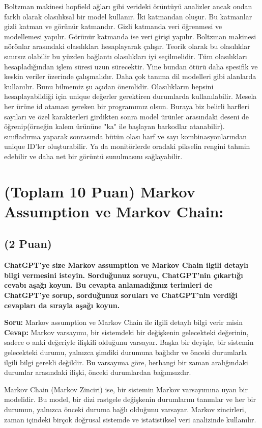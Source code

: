 \documentclass[11pt]{article}
\begin{document}
Boltzman makinesi hopfield ağları gibi verideki örüntüyü analizler ancak ondan farklı olarak olasılıksal bir model kullanır. İki katmandan oluşur. Bu katmanlar gizli katman ve görünür katmandır. Gizli katmanda veri öğrenmesi ve modellemesi yapılır. Görünür katmanda ise veri girişi yapılır. Boltzman makinesi nörönlar arasındaki olasılıkları hesaplayarak çalışır. Teorik olarak bu olasılıklar sınırsız olabilir bu yüzden bağlantı olasılıkları iyi seçilmelidir. Tüm olasılıkları hesapladığından işlem süresi uzun sürecektir. Yine bundan ötürü daha spesifik ve keskin veriler üzerinde çalışmalıdır. Daha çok tanıma dil modelleri gibi alanlarda kullanılır.
Bunu bilmemiz şu açıdan önemlidir. Olasılıkların hepsini hesaplayabildiği için unique değerler gerektiren durumlarda kullanılabilir. Mesela her ürüne id ataması gereken bir programımız olsun. Buraya biz belirli harfleri sayıları ve özel karakterleri girdikten sonra model ürünler arasındaki deseni de öğrenip(örneğin kalem ürününe "ka" ile başlayan barkodlar atanabilir). sınıfladırma yaparak sonrasında bütün olası harf ve sayı kombinasyonlarından unique ID'ler oluşturabilir. Ya da monitörlerde oradaki pikselin rengini tahmin edebilir ve daha net bir görüntü sunulmasını sağlayabilir. 


\section{(Toplam 10 Puan) Markov Assumption ve Markov Chain:}

\subsection{(2 Puan)} \textbf{ChatGPT’ye size Markov assumption ve Markov Chain ilgili detaylı bilgi vermesini isteyin. Sorduğunuz soruyu, ChatGPT'nin çıkartığı cevabı aşağı koyun. Bu cevapta anlamadığınız terimleri de ChatGPT’ye sorup, sorduğunuz soruları ve ChatGPT’nin verdiği cevapları da sırayla aşağı koyun.}

\textbf{Soru:} Markov assumption ve Markov Chain ile ilgili detaylı bilgi verir misin
\textbf{Cevap:} Markov varsayımı, bir sistemdeki bir değişkenin gelecekteki değerinin, sadece o anki değeriyle ilişkili olduğunu varsayar. Başka bir deyişle, bir sistemin gelecekteki durumu, yalnızca şimdiki durumuna bağlıdır ve önceki durumlarla ilgili bilgi gerekli değildir. Bu varsayıma göre, herhangi bir zaman aralığındaki durumlar arasındaki ilişki, önceki durumlardan bağımsızdır.

Markov Chain (Markov Zinciri) ise, bir sistemin Markov varsayımına uyan bir modelidir. Bu model, bir dizi rastgele değişkenin durumlarını tanımlar ve her bir durumun, yalnızca önceki duruma bağlı olduğunu varsayar. Markov zincirleri, zaman içindeki birçok doğrusal sistemde ve istatistiksel veri analizinde kullanılır.
\end{document}
